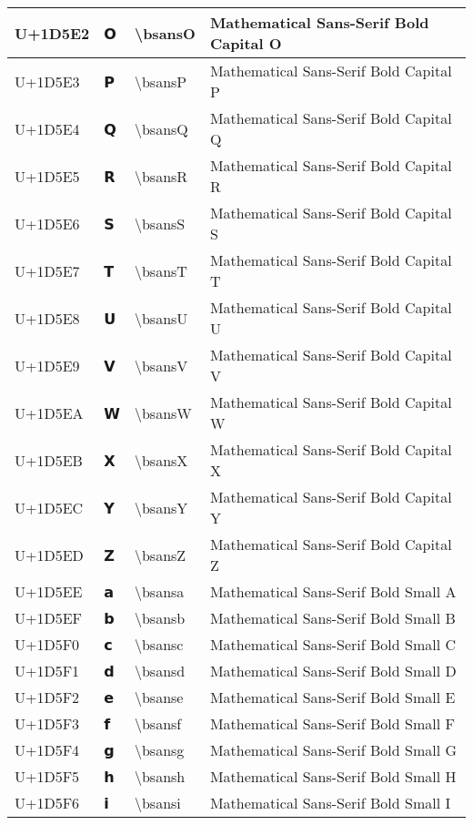 \begin{table}[h]
\begin{tabulary}{\linewidth}{|L|L|L|L|}
\hline
U+1D5E2 & 𝗢 & {\textbackslash}bsansO & Mathematical Sans-Serif Bold Capital O \\
\hline
U+1D5E3 & 𝗣 & {\textbackslash}bsansP & Mathematical Sans-Serif Bold Capital P \\
\hline
U+1D5E4 & 𝗤 & {\textbackslash}bsansQ & Mathematical Sans-Serif Bold Capital Q \\
\hline
U+1D5E5 & 𝗥 & {\textbackslash}bsansR & Mathematical Sans-Serif Bold Capital R \\
\hline
U+1D5E6 & 𝗦 & {\textbackslash}bsansS & Mathematical Sans-Serif Bold Capital S \\
\hline
U+1D5E7 & 𝗧 & {\textbackslash}bsansT & Mathematical Sans-Serif Bold Capital T \\
\hline
U+1D5E8 & 𝗨 & {\textbackslash}bsansU & Mathematical Sans-Serif Bold Capital U \\
\hline
U+1D5E9 & 𝗩 & {\textbackslash}bsansV & Mathematical Sans-Serif Bold Capital V \\
\hline
U+1D5EA & 𝗪 & {\textbackslash}bsansW & Mathematical Sans-Serif Bold Capital W \\
\hline
U+1D5EB & 𝗫 & {\textbackslash}bsansX & Mathematical Sans-Serif Bold Capital X \\
\hline
U+1D5EC & 𝗬 & {\textbackslash}bsansY & Mathematical Sans-Serif Bold Capital Y \\
\hline
U+1D5ED & 𝗭 & {\textbackslash}bsansZ & Mathematical Sans-Serif Bold Capital Z \\
\hline
U+1D5EE & 𝗮 & {\textbackslash}bsansa & Mathematical Sans-Serif Bold Small A \\
\hline
U+1D5EF & 𝗯 & {\textbackslash}bsansb & Mathematical Sans-Serif Bold Small B \\
\hline
U+1D5F0 & 𝗰 & {\textbackslash}bsansc & Mathematical Sans-Serif Bold Small C \\
\hline
U+1D5F1 & 𝗱 & {\textbackslash}bsansd & Mathematical Sans-Serif Bold Small D \\
\hline
U+1D5F2 & 𝗲 & {\textbackslash}bsanse & Mathematical Sans-Serif Bold Small E \\
\hline
U+1D5F3 & 𝗳 & {\textbackslash}bsansf & Mathematical Sans-Serif Bold Small F \\
\hline
U+1D5F4 & 𝗴 & {\textbackslash}bsansg & Mathematical Sans-Serif Bold Small G \\
\hline
U+1D5F5 & 𝗵 & {\textbackslash}bsansh & Mathematical Sans-Serif Bold Small H \\
\hline
U+1D5F6 & 𝗶 & {\textbackslash}bsansi & Mathematical Sans-Serif Bold Small I \\

\end{tabulary}
\end{table}
